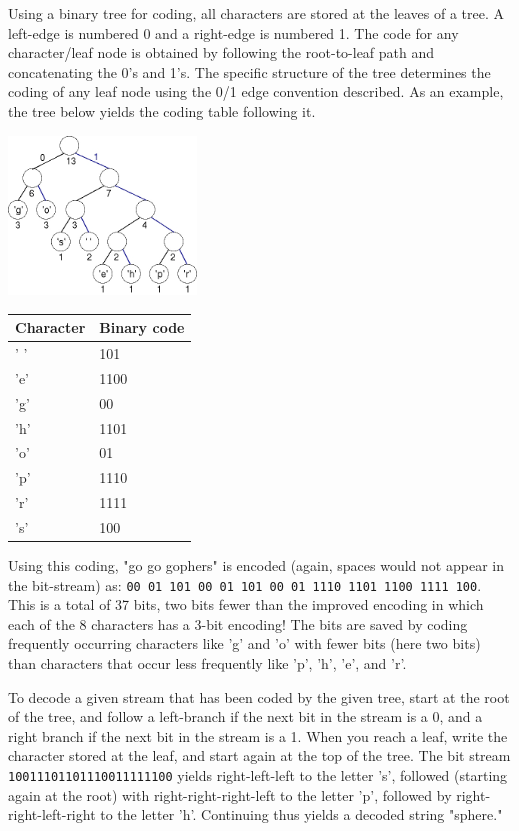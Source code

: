 \documentclass[11pt]{article}
\begin{document}
Using a binary tree for coding, all characters are stored at the
leaves of a tree.  A left-edge is numbered 0 and a right-edge is
numbered 1.  The code for any character/leaf node is obtained by
following the root-to-leaf path and concatenating the 0's and 1's. The
specific structure of the tree determines the coding of any leaf node
using the 0/1 edge convention described.  As an example, the tree below
yields the coding table following it.

\begin{center}
  \includegraphics[width=5cm]{figures/ngopher8}
\end{center}

\begin{tabular}{ll}
  \hline
  \textbf{Character} & \textbf{Binary code}\\
  \hline
  ' ' & 101\\
  'e' & 1100\\
  'g' & 00\\
  'h' & 1101\\
  'o' & 01\\
  'p' & 1110\\
  'r' & 1111\\
  's' & 100\\
  \hline
\end{tabular}

Using this coding, "go go gophers" is encoded (again, spaces would not
appear in the bit-stream) as: \texttt{00 01 101 00 01 101 00 01 1110
  1101 1100 1111 100}.  This is a total of 37 bits, two bits fewer
than the improved encoding in which each of the 8 characters has a
3-bit encoding!  The bits are saved by coding frequently occurring
characters like 'g' and 'o' with fewer bits (here two bits) than
characters that occur less frequently like 'p', 'h', 'e', and 'r'.
 
To decode a given stream that has been coded by the given tree, start
at the root of the tree, and follow a left-branch if the next bit in
the stream is a 0, and a right branch if the next bit in the stream is
a 1.  When you reach a leaf, write the character stored at the leaf,
and start again at the top of the tree.  The bit stream
\texttt{10011101101110011111100} yields right-left-left to the letter
's', followed (starting again at the root) with right-right-right-left
to the letter 'p', followed by right-right-left-right to the letter
'h'.  Continuing thus yields a decoded string "sphere."
\end{document}
